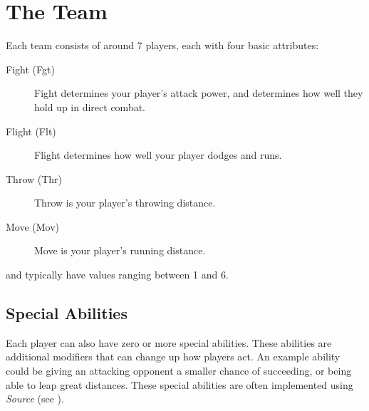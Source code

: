 \section{The Team} \label{the-team}
Each team consists of around 7 players, each with four basic attributes:

\begin{description}
    \item[Fight (Fgt)] Fight determines your player's attack power, and determines how well they hold up in direct combat.
    \item[Flight (Flt)] Flight determines how well your player dodges and runs.
    \item[Throw (Thr)] Throw is your player's throwing distance.
    \item[Move (Mov)] Move is your player's running distance.
\end{description}

\fight{} and \flight{} typically have values ranging between 1 and 6.

\subsection{Special Abilities}
Each player can also have zero or more special abilities.
These abilities are additional modifiers that can change up how players act.
An example ability could be giving an attacking opponent a smaller chance of succeeding, or being able to leap great distances.
These special abilities are often implemented using \textit{Source} (see ).
